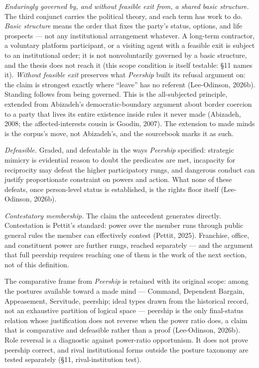 \documentclass[
  11pt,
  letterpaper,
]{article}
\begin{document}
\emph{Enduringly governed by, and without feasible exit from, a shared
basic structure.} The third conjunct carries the political theory, and
each term has work to do. \emph{Basic structure} means the order that
fixes the party's status, options, and life prospects --- not any
institutional arrangement whatever. A long-term contractor, a voluntary
platform participant, or a visiting agent with a feasible exit is
subject to an institutional order; it is not nonvoluntarily governed by
a basic structure, and the thesis does not reach it (this scope
condition is itself testable: §11 names it). \emph{Without feasible
exit} preserves what \emph{Peership} built its refusal argument on: the
claim is strongest exactly where ``leave'' has no referent (Lee-Odinson,
2026b). Standing follows from being governed. This is the all-subjected
principle, extended from Abizadeh's democratic-boundary argument about
border coercion to a party that lives its entire existence inside rules
it never made (Abizadeh, 2008; the affected-interests cousin is Goodin,
2007). The extension to made minds is the corpus's move, not Abizadeh's,
and the sourcebook marks it as such.

\emph{Defeasible.} Graded, and defeatable in the ways \emph{Peership}
specified: strategic mimicry is evidential reason to doubt the
predicates are met, incapacity for reciprocity may defeat the higher
participatory rungs, and dangerous conduct can justify proportionate
constraint on powers and action. What none of these defeats, once
person-level status is established, is the rights floor itself
(Lee-Odinson, 2026b).

\emph{Contestatory membership.} The claim the antecedent generates
directly. Contestation is Pettit's standard: power over the member runs
through public general rules the member can effectively contest (Pettit,
2025). Franchise, office, and constituent power are further rungs,
reached separately --- and the argument that full peership requires
reaching one of them is the work of the next section, not of this
definition.

The comparative frame from \emph{Peership} is retained with its original
scope: among the postures available toward a made mind --- Command,
Dependent Bargain, Appeasement, Servitude, peership; ideal types drawn
from the historical record, not an exhaustive partition of logical space
--- peership is the only final-status relation whose justification does
not reverse when the power ratio does, a claim that is comparative and
defeasible rather than a proof (Lee-Odinson, 2026b). Role reversal is a
diagnostic against power-ratio opportunism. It does not prove peership
correct, and rival institutional forms outside the posture taxonomy are
tested separately (§11, rival-institution test).
\end{document}

